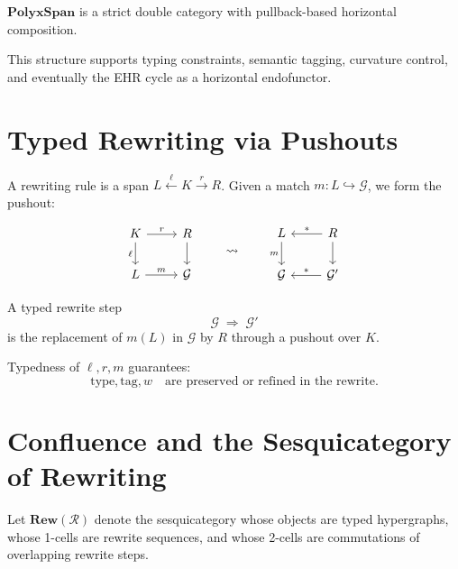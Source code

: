 \begin{theorem}
$\mathbf{PolyxSpan}$ is a strict double category with pullback-based
horizontal composition.
\end{theorem}

This structure supports typing constraints, semantic tagging, curvature
control, and eventually the EHR cycle as a horizontal endofunctor.

\section{Typed Rewriting via Pushouts}

A rewriting rule is a span $L \xleftarrow{\ell} K \xrightarrow{r} R$.
Given a match $m : L\hookrightarrow\mathcal{G}$, we form the pushout:

\[
\begin{tikzcd}
K \arrow[r,"r"] \arrow[d,"\ell"'] & R \arrow[d]\\
L \arrow[r,"m"] & \mathcal{G}
\end{tikzcd}
\qquad\leadsto\qquad
\begin{tikzcd}
L \arrow[d,"m"'] & R \arrow[l,"\ast"'] \arrow[d]\\
\mathcal{G} & \mathcal{G}' \arrow[l,"\ast"']
\end{tikzcd}
\]

\begin{definition}
A typed rewrite step
\[
\mathcal{G} \;\Rightarrow\; \mathcal{G}'
\]
is the replacement of $m(L)$ in $\mathcal{G}$ by $R$ through a pushout over $K$.
\end{definition}

Typedness of $\ell,r,m$ guarantees:
\[
\mathrm{type},\mathrm{tag},w \quad\text{are preserved or refined in the rewrite}.
\]

\section{Confluence and the Sesquicategory of Rewriting}

Let $\mathbf{Rew}(\mathcal{R})$ denote the sesquicategory whose objects are
typed hypergraphs, whose 1-cells are rewrite sequences, and whose
2-cells are commutations of overlapping rewrite steps.

